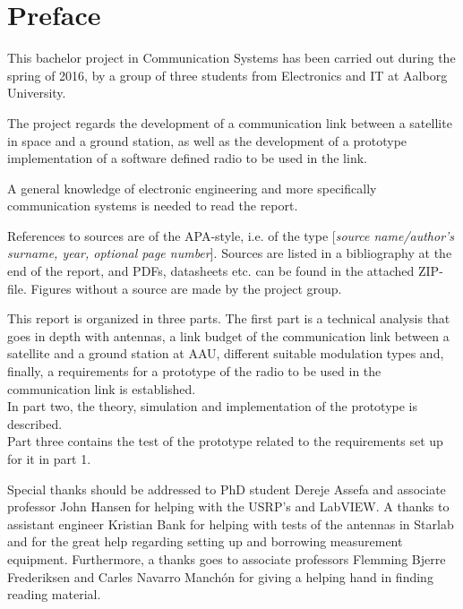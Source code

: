 \chapter*{Preface}\label{ch:forord}%

This bachelor project in Communication Systems has been carried out during the spring of 2016, by a group of three students from Electronics and IT at Aalborg University.

The project regards the development of a communication link between a satellite in space and a ground station, as well as  the development of a prototype implementation of a software defined radio to be used in the link.

A general knowledge of electronic engineering and more specifically communication systems is needed to read the report.  

References to sources are of the APA-style, i.e. of the type [\emph{source name/author's surname, year, optional page number}]. Sources are listed in a bibliography at the end of the report, and PDFs, datasheets etc. can be found in the attached ZIP-file. Figures without a source are made by the project group.%

This report is organized in three parts. The first part is a technical analysis that goes in depth with antennas, a link budget of the communication link between a satellite and a ground station at AAU, different suitable modulation types and, finally, a requirements for a prototype of the radio to be used in the communication link is established. \\ In part two, the theory, simulation and implementation of the prototype is described. \\ Part three contains the test of the prototype related to the requirements set up for it in part 1. %

Special thanks should be addressed to PhD student Dereje Assefa and associate professor John Hansen for helping with the USRP's and LabVIEW. A thanks to assistant engineer Kristian Bank for helping with tests of the antennas in Starlab and for the great help regarding setting up and borrowing measurement equipment. Furthermore, a thanks goes to associate professors Flemming Bjerre Frederiksen and Carles Navarro Manchón for giving a helping hand in finding reading material.

